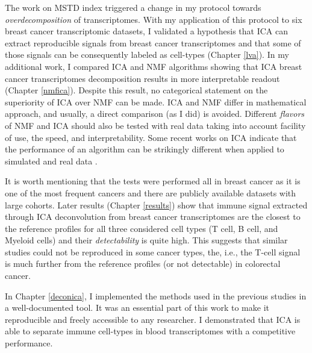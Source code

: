 \documentclass[12pt,]{book}
\theoremstyle{definition}
\theoremstyle{definition}
\theoremstyle{definition}
\theoremstyle{remark}
\begin{document}
The work on MSTD index triggered a change in my protocol towards
\emph{overdecomposition} of transcriptomes. With my application of this
protocol to six breast cancer transcriptomic datasets, I validated a
hypothesis that ICA can extract reproducible signals from breast cancer
transcriptomes and that some of those signals can be consequently
labeled as cell-types (Chapter \ref{lva}). In my additional work, I
compared ICA and NMF algorithms showing that ICA breast cancer
transcriptomes decomposition results in more interpretable readout
(Chapter \ref{nmfica}). Despite this result, no categorical statement on
the superiority of ICA over NMF can be made. ICA and NMF differ in
mathematical approach, and usually, a direct comparison (as I did) is
avoided. Different \emph{flavors} of NMF and ICA should also be tested
with real data taking into account facility of use, the speed, and
interpretability. Some recent works on ICA indicate that the performance
of an algorithm can be strikingly different when applied to simulated
and real data \citep{Ablin2018}.

​It is worth mentioning that the tests were performed all in breast
cancer as it is one of the most frequent cancers and there are publicly
available datasets with large cohorts. Later results (Chapter
\ref{results}) show that immune signal extracted through ICA
deconvolution from breast cancer transcriptomes are the closest to the
reference profiles for all three considered cell types (T cell, B cell,
and Myeloid cells) and their \emph{detectability} is quite high. This
suggests that similar studies could not be reproduced in some cancer
types, the, i.e., the T-cell signal is much further from the reference
profiles (or not detectable) in colorectal cancer.

In Chapter \ref{deconica}, I implemented the methods used in the
previous studies in a well-documented tool. It was an essential part of
this work to make it reproducible and freely accessible to any
researcher. I demonstrated that ICA is able to separate immune
cell-types in blood transcriptomes with a competitive performance.
\end{document}
